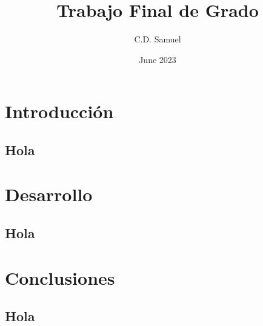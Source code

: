 \documentclass[11pt]{report}
\title{Trabajo Final de Grado}
\author{C.D. Samuel}
\date{June 2023}
\begin{document}
	\nocite{*} %

	
	\clearpage
	
	\clearpage

	\tableofcontents

	\cleardoublepage
	\listoffigures

	\cleardoublepage
	\listoftables

	\clearpage


	\chapter{Introducción}\label{ch:introduction}
	\blindtext[20]


	\section{Hola}\label{sec:hola1}
	\textbf{\blindtext[10]}


	\chapter{Desarrollo}\label{ch:development}
	\blindtext[20]


	\section{Hola}\label{sec:hola2}
	\textbf{\blindtext[10]}


	\chapter{Conclusiones}\label{ch:conclusions}
	\blindtext[20]


	\section{Hola}\label{sec:hola3}
	\textbf{\blindtext[10]}

	\cleardoublepage
	
	
\end{document}
